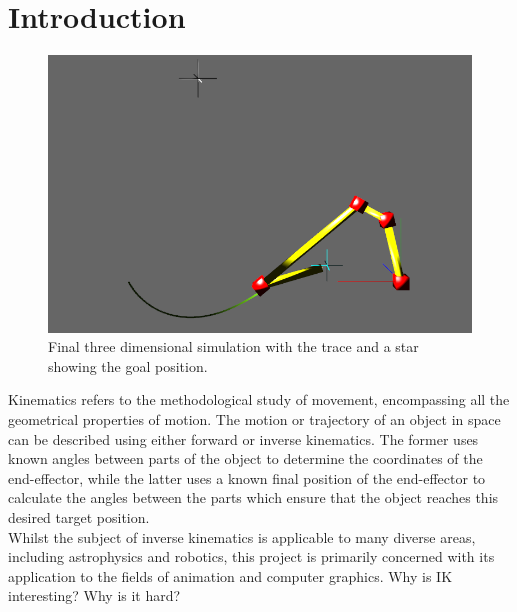 \documentclass[paper=a4, fontsize=11pt]{scrartcl} %
\numberwithin{equation}{section} %
\numberwithin{figure}{section} %
\numberwithin{table}{section} %
\begin{document}
\section{Introduction}
\begin{figure}
\centering
\includegraphics[scale=0.4]{chain3Dexamplev2}
\caption{Final three dimensional simulation with the trace and a star showing the goal position.}
\label{fig:3Dpicture}
\end{figure}

Kinematics refers to the methodological study of movement, encompassing all the geometrical properties of motion. The motion or trajectory of an object in space can be described using either forward or inverse kinematics. The former uses known angles between parts of the object to determine the coordinates of the end-effector, while the latter uses a known final position of the end-effector to calculate the angles between the parts which ensure that the object reaches this desired target position. \\

Whilst the subject of inverse kinematics is applicable to many diverse areas, including astrophysics and robotics, this project is primarily concerned with its application to the fields of animation and computer graphics. Why is IK interesting? Why is it hard?\\
\end{document}
